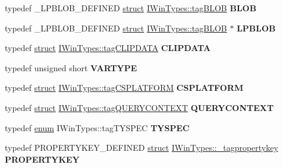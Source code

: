 \begin{DoxyCompactItemize}
\item 
\mbox{\label{interface_i_win_types_a0b652dad4951d7707201c072b36acf7c}} 
typedef \+\_\+\+L\+P\+B\+L\+O\+B\+\_\+\+D\+E\+F\+I\+N\+ED \hyperlink{interfacestruct}{struct} \hyperlink{struct_i_win_types_1_1tag_b_l_o_b}{I\+Win\+Types\+::tag\+B\+L\+OB} {\bfseries B\+L\+OB}
\item 
\mbox{\label{interface_i_win_types_a32619f8d15e5e1773156a1aaf1814c1f}} 
typedef \+\_\+\+L\+P\+B\+L\+O\+B\+\_\+\+D\+E\+F\+I\+N\+ED \hyperlink{interfacestruct}{struct} \hyperlink{struct_i_win_types_1_1tag_b_l_o_b}{I\+Win\+Types\+::tag\+B\+L\+OB} $\ast$ {\bfseries L\+P\+B\+L\+OB}
\item 
\mbox{\label{interface_i_win_types_a4dd5745e1fd48f0ddf7ce7379c3cc215}} 
typedef \hyperlink{interfacestruct}{struct} \hyperlink{struct_i_win_types_1_1tag_c_l_i_p_d_a_t_a}{I\+Win\+Types\+::tag\+C\+L\+I\+P\+D\+A\+TA} {\bfseries C\+L\+I\+P\+D\+A\+TA}
\item 
\mbox{\label{interface_i_win_types_a13c9208448c1312c63f60703134b4adc}} 
typedef unsigned short {\bfseries V\+A\+R\+T\+Y\+PE}
\item 
\mbox{\label{interface_i_win_types_ac04562acad3b710407ea08e562e4f0eb}} 
typedef \hyperlink{interfacestruct}{struct} \hyperlink{struct_i_win_types_1_1tag_c_s_p_l_a_t_f_o_r_m}{I\+Win\+Types\+::tag\+C\+S\+P\+L\+A\+T\+F\+O\+RM} {\bfseries C\+S\+P\+L\+A\+T\+F\+O\+RM}
\item 
\mbox{\label{interface_i_win_types_a4a68f022aa5eaaa6307ab88a116e7da1}} 
typedef \hyperlink{interfacestruct}{struct} \hyperlink{struct_i_win_types_1_1tag_q_u_e_r_y_c_o_n_t_e_x_t}{I\+Win\+Types\+::tag\+Q\+U\+E\+R\+Y\+C\+O\+N\+T\+E\+XT} {\bfseries Q\+U\+E\+R\+Y\+C\+O\+N\+T\+E\+XT}
\item 
\mbox{\label{interface_i_win_types_acd6a0392a1a797a474110b47e233ffd7}} 
typedef \hyperlink{interfaceenum}{enum} I\+Win\+Types\+::tag\+T\+Y\+S\+P\+EC {\bfseries T\+Y\+S\+P\+EC}
\item 
\mbox{\label{interface_i_win_types_adc9b83de405be9be439b96c25fb8220c}} 
typedef P\+R\+O\+P\+E\+R\+T\+Y\+K\+E\+Y\+\_\+\+D\+E\+F\+I\+N\+ED \hyperlink{interfacestruct}{struct} \hyperlink{struct_i_win_types_1_1__tagpropertykey}{I\+Win\+Types\+::\+\_\+tagpropertykey} {\bfseries P\+R\+O\+P\+E\+R\+T\+Y\+K\+EY}
\end{DoxyCompactItemize}
